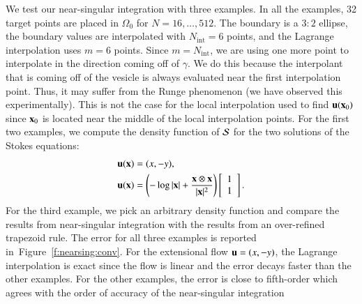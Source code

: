 \begin{figure}[htp]
  \begin{center}
    \begin{minipage}{0.45\textwidth}
    
    \end{minipage}
    \begin{minipage}{0.45\textwidth}
     
    \end{minipage} 
  \end{center} 
\end{figure}

We test our near-singular integration with three examples.  In all the
examples, 32 target points are placed in $\Omega_{0}$ for
$N=16,\ldots,512$.  The boundary is a $3:2$ ellipse, the boundary values
are interpolated with $N_{\mathrm{int}}=6$ points, and the Lagrange
interpolation uses $m=6$ points.  Since $m = N_{\mathrm{int}}$, we are
using one more point to interpolate in the direction coming off of
$\gamma$.  We do this because the interpolant that is coming off of the
vesicle is always evaluated near the first interpolation point.  Thus,
it may suffer from the Runge phenomenon (we have observed this
experimentally).  This is not the case for the local interpolation used
to find ${\mathbf{u}}({\mathbf{x}}_{0})$ since ${\mathbf{x}}_{0}$ is located near the middle of the
local interpolation points.  For the first two examples, we compute the
density function of ${\mathcal{S}}$ for the two solutions of the Stokes equations:
\begin{align*}
  &{\mathbf{u}}({\mathbf{x}})=(x,-y), \\
  &{\mathbf{u}}({\mathbf{x}})=\left(-\log|{\mathbf{x}}| + \frac{{\mathbf{x}} \otimes {\mathbf{x}}}{|{\mathbf{x}}|^{2}}\right)
  \left[ \begin{array}{c}
    1 \\ 1 
  \end{array}\right].
\end{align*}
For the third example, we pick an arbitrary density function and compare
the results from near-singular integration with the results from an
over-refined trapezoid rule.  The error for all three examples is
reported in~Figure~\ref{f:nearsing:conv}.  For the extensional flow ${\mathbf{u}}
= (x,-y)$, the Lagrange interpolation is exact since the flow is linear
and the error decays faster than the other examples.  For the other
examples, the error is close to fifth-order which agrees with the order
of accuracy of the near-singular integration

